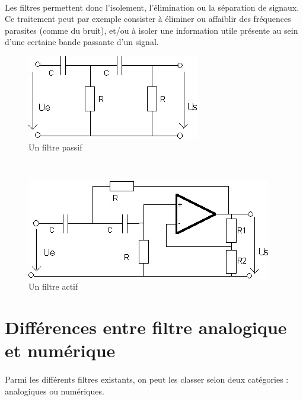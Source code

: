 \documentclass[a4paper,11pt]{article}
\begin{document}
    \paragraph{}
Les filtres permettent donc l’isolement, l’élimination ou la séparation de signaux.
Ce traitement peut par exemple consister à éliminer ou affaiblir des fréquences parasites (comme du bruit), et/ou à isoler une information utile présente au sein d'une certaine bande passante d'un signal.
    \\
    \begin{figure}[h]
        \begin{center}
            \includegraphics[scale=0.7]{images/filtres/filtre-passif.jpg}
        \end{center}
            \caption{ Un filtre passif }
            \label{Un exemple de filtre passif}
    \end{figure}
    \\
    \begin{figure}[h]
        \begin{center}
            \includegraphics[scale=0.7]{images/filtres/filtre-actif.jpg}
        \end{center}
            \caption{ Un filtre actif }
            \label{Un exemple de filtre actif}
    \end{figure}

    \clearpage


\section{Différences entre filtre analogique et numérique}
    \paragraph{}
Parmi les différents filtres existants, on peut les classer selon deux catégories : analogiques ou numériques.
\end{document}
